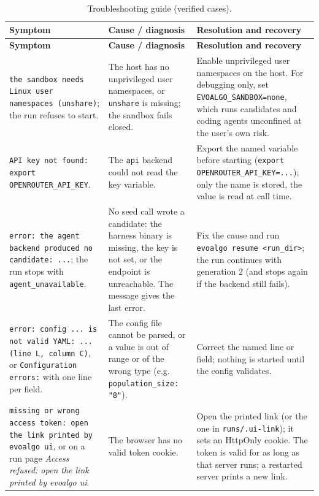 \begin{scriptsize}
\setlength{\tabcolsep}{4pt}
\begin{longtable}{@{}p{}p{}p{}@{}}
\caption{Troubleshooting guide (verified cases).}\label{tab:ud-trouble}\\
\toprule
\textbf{Symptom} & \textbf{Cause / diagnosis} & \textbf{Resolution and recovery} \\
\midrule
\endfirsthead
\toprule
\textbf{Symptom} & \textbf{Cause / diagnosis} & \textbf{Resolution and recovery} \\
\midrule
\endhead
\bottomrule
\endfoot
\texttt{the sandbox needs Linux user namespaces (unshare)}; the run refuses to start. & The host has no unprivileged user namespaces, or \texttt{unshare} is missing; the sandbox fails closed. & Enable unprivileged user namespaces on the host. For debugging only, set \texttt{EVOALGO\_SANDBOX=none}, which runs candidates and coding agents unconfined at the user's own risk. \\
\addlinespace[2pt]
\texttt{API key not found: export OPENROUTER\_API\_KEY}. & The \texttt{api} backend could not read the key variable. & Export the named variable before starting (\texttt{export OPENROUTER\_API\_KEY=...}); only the name is stored, the value is read at call time. \\
\addlinespace[2pt]
\texttt{error: the agent backend produced no candidate: ...}; the run stops with \texttt{agent\_unavailable}. & No seed call wrote a candidate: the harness binary is missing, the key is not set, or the endpoint is unreachable. The message gives the last error. & Fix the cause and run \texttt{evoalgo resume <run\_dir>}; the run continues with generation 2 (and stops again if the backend still fails). \\
\addlinespace[2pt]
\texttt{error: config ... is not valid YAML: ... (line L, column C)}, or \texttt{Configuration errors:} with one line per field. & The config file cannot be parsed, or a value is out of range or of the wrong type (e.g. \texttt{population\_size: "8"}). & Correct the named line or field; nothing is started until the config validates. \\
\addlinespace[2pt]
\texttt{missing or wrong access token: open the link printed by evoalgo ui}, or on a run page \emph{Access refused: open the link printed by evoalgo ui}. & The browser has no valid token cookie. & Open the printed link (or the one in \texttt{runs/.ui-link}); it sets an HttpOnly cookie. The token is valid for as long as that server runs; a restarted server prints a new link. \\

\end{longtable}
\end{scriptsize}
